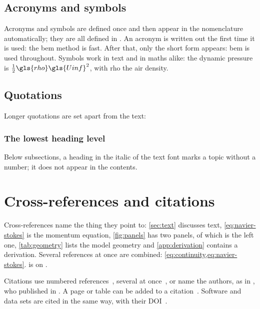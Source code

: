 \subsection{Acronyms and symbols}

Acronyms and symbols are defined once and then appear in the nomenclature automatically; they are all defined in . An acronym is written out the first time it is used: the \gls{bem} method is fast. After that, only the short form appears: \gls{bem} is used throughout. Symbols work in text and in maths alike: the dynamic pressure is $\frac{1}{2} \gls{rho} \gls{Uinf}^2$, with \gls{rho} the air density.

\subsection{Quotations}

Longer quotations are set apart from the text:
\begin{quote}
    \lipsum[1][1-3]
\end{quote}

\subsubsection{The lowest heading level}
Below subsections, a heading in the italic of the text font marks a topic without a number; it does not appear in the contents.

\section{Cross-references and citations}\label{sec:references}

Cross-references name the thing they point to: \cref{sec:text} discusses text, \cref{eq:navier-stokes} is the momentum equation, \cref{fig:panels} has two panels, of which  is the left one, \cref{tab:geometry} lists the model geometry and \cref{app:derivation} contains a derivation. Several references at once are combined: \cref{eq:continuity,eq:navier-stokes}.  is on .

Citations use numbered references~\cite{Allen2002}, several at once~\cite{Sinnige2020,Bettini2021,Eitelberg2020}, or name the authors, as in \citet{Herrez2016}, who published in \citeyear{Herrez2016}. A page or table can be added to a citation~\cite[Tab.~4]{Bettini2021}. Software and data sets are cited in the same way, with their DOI~\cite{BettiniCode2026,BettiniData2026}.

